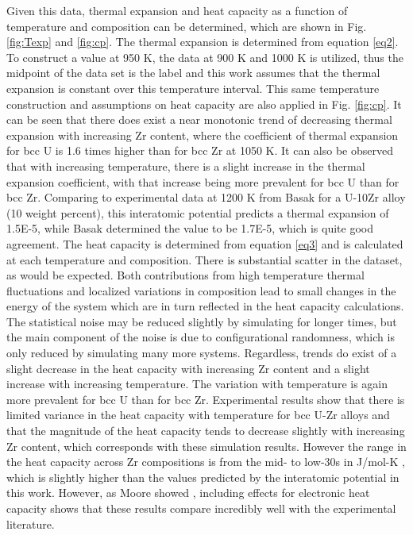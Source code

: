 \documentclass[review]{elsarticle}
\begin{document}
Given this data, thermal expansion and heat capacity as a function of temperature and composition can be determined, which are shown in Fig. \ref{fig:Texp} and \ref{fig:cp}. The thermal expansion is determined from equation \ref{eq2}. To construct a value at 950 K, the data at 900 K and 1000 K is utilized, thus the midpoint of the data set is the label and this work assumes that the thermal expansion is constant over this temperature interval. This same temperature construction and assumptions on heat capacity are also applied in Fig. \ref{fig:cp}. It can be seen that there does exist a near monotonic trend of decreasing thermal expansion with increasing Zr content, where the coefficient of thermal expansion for bcc U is 1.6 times higher than for bcc Zr at 1050 K. It can also be observed that with increasing temperature, there is a slight increase in the thermal expansion coefficient, with that increase being more prevalent for bcc U than for bcc Zr. Comparing to experimental data at 1200 K from Basak \cite{basak2009} for a U-10Zr alloy (10 weight percent), this interatomic potential predicts a thermal expansion of 1.5E-5, while Basak determined the value to be 1.7E-5, which is quite good agreement. The heat capacity is determined from equation \ref{eq3} and is calculated at each temperature and composition.  There is substantial scatter in the dataset, as would be expected. Both contributions from high temperature thermal fluctuations and localized variations in composition lead to small changes in the energy of the system which are in turn reflected in the heat capacity calculations. The statistical noise may be reduced slightly by simulating for longer times, but the main component of the noise is due to configurational randomness, which is only reduced by simulating many more systems. Regardless, trends do exist of a slight decrease in the heat capacity with increasing Zr content and a slight increase with increasing temperature. The variation with temperature is again more prevalent for bcc U than for bcc Zr. Experimental results show that there is limited variance in the heat capacity with temperature for bcc U-Zr alloys and that the magnitude of the heat capacity tends to decrease slightly with increasing Zr content, which corresponds with these simulation results. However the range in the heat capacity across Zr compositions is from the mid- to low-30s in J/mol-K \cite{janney2018}, which is slightly higher than the values predicted by the interatomic potential in this work. However, as Moore showed \cite{moore2015}, including effects for electronic heat capacity shows that these results compare incredibly well with the experimental literature. 
\end{document}
